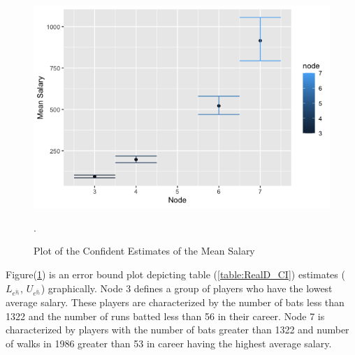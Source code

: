 \vspace{0.1in}
\vspace{0.1in}
\begin{figure}[H]
	\centering
	\includegraphics[scale=0.70, angle=0]{Conf_Plot.png}
	\caption{Plot of the Confident Estimates of the Mean Salary}. 
		\label{Conf_Plot}
\end{figure}
Figure(\ref{Conf_Plot}) is an error bound plot depicting table (\ref{table:RealD_CI}) estimates ( $L_{e^{\bar{y}_{t}}}$, $U_{e^{\bar{y}_{t}}}$) graphically. Node 3 defines a group of players who have the lowest average salary. These players are characterized by the number of bats less than 1322 and the number of runs batted less than 56 in their career. Node 7 is characterized by players with the number of bats greater than 1322 and number of walks in 1986 greater than 53 in career having the highest average salary.



